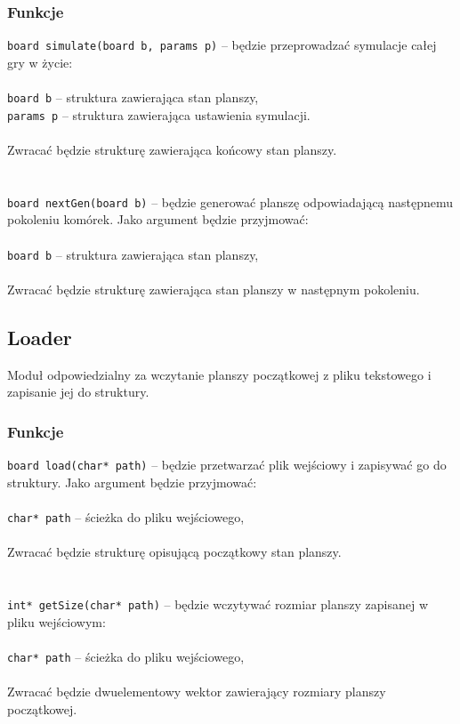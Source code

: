 \documentclass{article}
\begin{document}
\subsubsection{Funkcje}
\texttt{board simulate(board b, params p)} -- będzie przeprowadzać symulacje całej gry w życie:\\\\
	 \hspace*{10mm}\texttt{board b} -- struktura zawierająca stan planszy,\\
	 \hspace*{10mm}\texttt{params p} -- struktura zawierająca ustawienia symulacji.\\
\\
Zwracać będzie strukturę zawierająca końcowy stan planszy.\\\\
\\
\texttt{board nextGen(board b)} -- będzie generować planszę odpowiadającą następnemu pokoleniu komórek. Jako argument będzie przyjmować:\\\\
	 \hspace*{10mm}\texttt{board b} -- struktura zawierająca stan planszy,\\
\\
Zwracać będzie strukturę zawierająca stan planszy w następnym pokoleniu.

\subsection{Loader}
Moduł odpowiedzialny za wczytanie planszy początkowej z pliku tekstowego i zapisanie jej do struktury.

\subsubsection{Funkcje}
\texttt{board load(char* path)} -- będzie przetwarzać plik wejściowy i zapisywać go do struktury. Jako argument będzie przyjmować:\\\\
	 \hspace*{10mm}\texttt{char* path} -- ścieżka do pliku wejściowego,\\
\\
Zwracać będzie strukturę opisującą początkowy stan planszy.\\\\
\\
\texttt{int* getSize(char* path)} -- będzie wczytywać rozmiar planszy zapisanej w pliku wejściowym:\\\\
	 \hspace*{10mm}\texttt{char* path} -- ścieżka do pliku wejściowego,\\
\\
Zwracać będzie dwuelementowy wektor zawierający rozmiary planszy początkowej.
\end{document}
